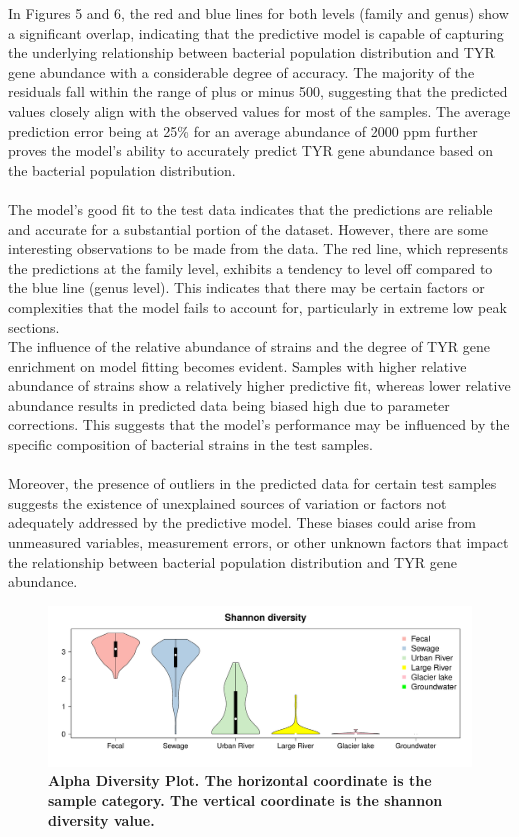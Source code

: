 \documentclass[12pt]{article}
\begin{document}
In Figures 5 and 6, the red and blue lines for both levels (family and genus) show a significant overlap, indicating that the predictive model is capable of capturing the underlying relationship between bacterial population distribution and TYR gene abundance with a considerable degree of accuracy. The majority of the residuals fall within the range of plus or minus 500, suggesting that the predicted values closely align with the observed values for most of the samples. The average prediction error being at 25\% for an average abundance of 2000 ppm further proves the model's ability to accurately predict TYR gene abundance based on the bacterial population distribution.\\\\
The model's good fit to the test data indicates that the predictions are reliable and accurate for a substantial portion of the dataset. However, there are some interesting observations to be made from the data. The red line, which represents the predictions at the family level, exhibits a tendency to level off compared to the blue line (genus level). This indicates that there may be certain factors or complexities that the model fails to account for, particularly in extreme low peak sections.\\
The influence of the relative abundance of strains and the degree of TYR gene enrichment on model fitting becomes evident. Samples with higher relative abundance of strains show a relatively higher predictive fit, whereas lower relative abundance results in predicted data being biased high due to parameter corrections. This suggests that the model's performance may be influenced by the specific composition of bacterial strains in the test samples.\\\\
Moreover, the presence of outliers in the predicted data for certain test samples suggests the existence of unexplained sources of variation or factors not adequately addressed by the predictive model. These biases could arise from unmeasured variables, measurement errors, or other unknown factors that impact the relationship between bacterial population distribution and TYR gene abundance.
\begin{figure}[H]
    \centering
     \includegraphics[width=1\linewidth]{pic/alpha.pdf} 
      \caption{\small\bfseries Alpha Diversity Plot. The horizontal coordinate is the sample category. The vertical coordinate is the shannon diversity value.}
\end{figure}
\end{document}
